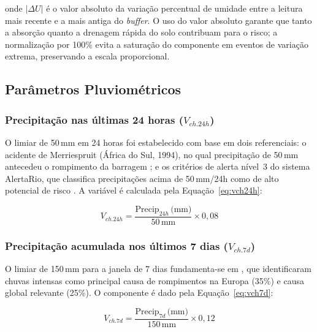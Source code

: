 \noindent onde $|\Delta U|$ é o valor absoluto da variação percentual de umidade
entre a leitura mais recente e a mais antiga do \textit{buffer}. O uso do
valor absoluto garante que tanto a absorção quanto a drenagem rápida do solo
contribuam para o risco; a normalização por 100\% evita a saturação do
componente em eventos de variação extrema, preservando a escala proporcional.

\subsection{Parâmetros Pluviométricos}
\label{subsec:pluviometricos}

\subsubsection{Precipitação nas últimas 24 horas (\texorpdfstring{$V_{ch.24h}$}{V\_ch.24h})}

O limiar de 50\,mm em 24 horas foi estabelecido com base em dois
referenciais: o acidente de Merriespruit (África do Sul, 1994), no
qual precipitação de 50\,mm antecedeu o rompimento da barragem
\cite{rico2008mine}; e os critérios de alerta nível~3 do sistema
AlertaRio, que classifica precipitações acima de 50\,mm/24h como de
alto potencial de risco \cite{sistemaalertario2025}. A variável é calculada
pela Equação~\ref{eq:vch24h}:

\begin{equation}
\label{eq:vch24h}
V_{ch.24h} = \frac{\text{Precip}_{24h}\,\text{(mm)}}{50\,\text{mm}}
             \times 0{,}08
\end{equation}

\subsubsection{Precipitação acumulada nos últimos 7 dias (\texorpdfstring{$V_{ch.7d}$}{V\_ch.7d})}

O limiar de 150\,mm para a janela de 7 dias fundamenta-se em
, que identificaram chuvas intensas como
principal causa de rompimentos na Europa (35\%) e causa global
relevante (25\%). O componente é dado pela Equação~\ref{eq:vch7d}:

\begin{equation}
\label{eq:vch7d}
V_{ch.7d} = \frac{\text{Precip}_{7d}\,\text{(mm)}}{150\,\text{mm}}
            \times 0{,}12
\end{equation}

